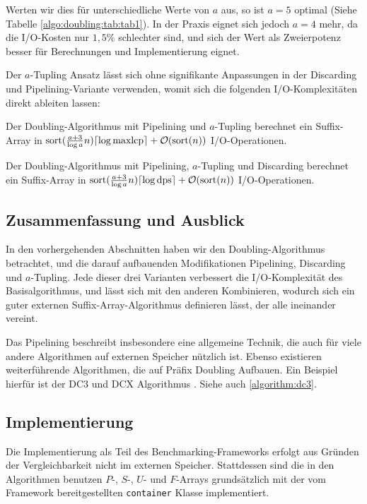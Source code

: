 Werten wir dies für unterschiedliche Werte von $a$ aus, so ist $a = 5$ optimal (Siehe Tabelle \ref{algo:doubling:tab:tab1}). In der Praxis eignet sich jedoch $a = 4$ mehr, da die I/O-Kosten nur $1,5\%$ schlechter sind, und sich der Wert als Zweierpotenz besser für Berechnungen und Implementierung eignet.

Der $a$-Tupling Ansatz lässt sich ohne signifikante Anpassungen in der Discarding und Pipelining-Variante verwenden, womit sich die folgenden I/O-Komplexitäten direkt ableiten lassen:

\begin{theorem}
Der Doubling-Algorithmus mit Pipelining und $a$-Tupling berechnet ein Suffix-Array in $\text{sort}(\frac{a + 3}{\log a}n) \ceil*{\log \text{maxlcp}} +  \mathcal{O}(\text{sort}(n))$ I/O-Operationen.
\end{theorem}

\begin{theorem}
Der Doubling-Algorithmus mit Pipelining, $a$-Tupling und Discarding berechnet ein Suffix-Array in $\text{sort}(\frac{a + 3}{\log a}n) \ceil*{\log \text{dps}} +  \mathcal{O}(\text{sort}(n))$ I/O-Operationen.
\end{theorem}

\subsection{Zusammenfassung und Ausblick}
\label{algo:doubling:sec:summary}

In den vorhergehenden Abschnitten haben wir den Doubling-Algorithmus betrachtet, und die darauf aufbauenden Modifikationen Pipelining, Discarding und $a$-Tupling. Jede dieser drei Varianten verbessert die I/O-Komplexität des Basisalgorithmus, und lässt sich mit den anderen Kombinieren, wodurch sich ein guter externen Suffix-Array-Algorithmus definieren lässt, der alle ineinander vereint.

Das Pipelining beschreibt insbesondere eine allgemeine Technik, die auch für viele andere Algorithmen auf externen Speicher nützlich ist. Ebenso existieren weiterführende Algorithmen, die auf Präfix Doubling Aufbauen. Ein Beispiel hierfür ist der DC3 und DCX Algorithmus \cite{saca:11}. Siehe auch \cref{algorithm:dc3}.

\subsection{Implementierung}
Die Implementierung als Teil des Benchmarking-Frameworks erfolgt aus Gründen der Vergleichbarkeit nicht im externen Speicher. Stattdessen sind die in den Algorithmen benutzen $P$-, $S$-, $U$- und $F$-Arrays grundsätzlich mit der vom Framework bereitgestellten \texttt{container} Klasse implementiert.

